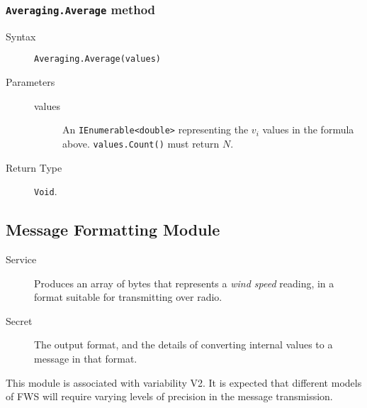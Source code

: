 \documentclass[letterpaper,11pt]{article}
\begin{document}
\subsubsection{\texttt{Averaging.Average} method}
\begin{description}
\item[Syntax] \texttt{Averaging.Average(values)}
\item[Parameters] \hfill
  \begin{description}
  \item[values] An \texttt{IEnumerable<double>} representing the $v_i$ values in the formula above.  \texttt{values.Count()} must return $N$.
  \end{description}
\item[Return Type] \texttt{Void}.
\end{description}


\subsection{Message Formatting Module}
\begin{description}
\item[Service] Produces an array of bytes that represents a \textit{wind speed} reading, in a format suitable for transmitting over radio.
\item[Secret] The output format, and the details of converting internal values to a message in that format. 
\end{description}

This module is associated with variability V2.  It is expected that different models of FWS will require varying levels of precision in the message transmission.

%
\end{document}
